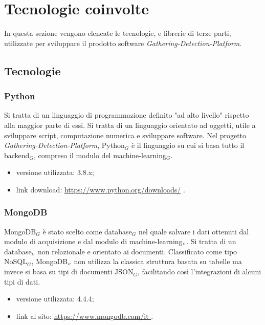 \chapter{Tecnologie coinvolte}\label{TecnologieCoinvolte}
In questa sezione vengono elencate le tecnologie, e librerie di terze parti, utilizzate per sviluppare il prodotto software \textit{Gathering-Detection-Platform}.

\section{Tecnologie}\label{Tecnologie}
\subsection{Python}\label{TecnologiePython}
Si tratta di un linguaggio di programmazione definito "ad alto livello" rispetto alla maggior parte di essi.
Si tratta di un linguaggio orientato ad oggetti, utile a sviluppare script, computazione numerica e sviluppare software.
Nel progetto \textit{Gathering-Detection-Platform}, Python$_G$ è il linguaggio su cui si basa tutto il backend$_G$, compreso il modulo del machine-learning$_G$.

\begin{itemize}
  \item versione utilizzata: 3.8.x;
  \item link download: \url{https://www.python.org/downloads/} .
\end{itemize}

\subsection{MongoDB}\label{TecnologieMongoDB}
MongoDB$_G$ è stato scelto come database$_G$ nel quale salvare i dati ottenuti dal modulo di acquisizione e dal modulo di machine-learning$_{\scaleto{G}{3pt}}$.
Si tratta di un database$_{\scaleto{G}{3pt}}$ non relazionale e orientato ai documenti.
Classificato come tipo NoSQL$_G$, MongoDB$_{\scaleto{G}{3pt}}$ non utilizza la classica struttura basata su tabelle ma invece si basa su tipi di documenti JSON$_G$, facilitando così l'integrazioni di alcuni tipi di dati.

\begin{itemize}
    \item versione utilizzata: 4.4.4;
    \item link al sito: \url{https://www.mongodb.com/it }.
\end{itemize}


